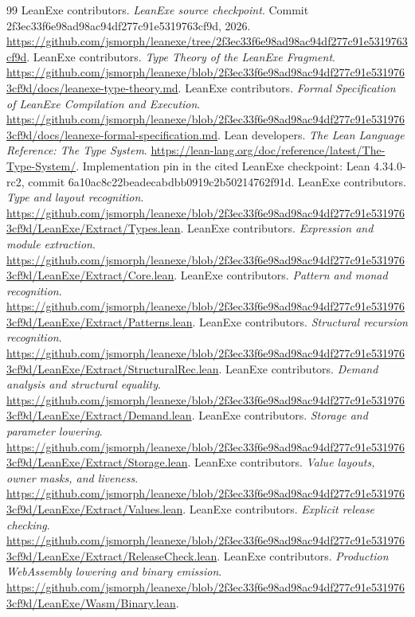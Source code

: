 \documentclass[11pt]{article}
\begin{document}
\begin{thebibliography}{99}
\small
{} LeanExe contributors. \emph{LeanExe source checkpoint}. Commit 2f3ec33f6e98ad98ac94df277c91e5319763cf9d, 2026. \url{https://github.com/jsmorph/leanexe/tree/2f3ec33f6e98ad98ac94df277c91e5319763cf9d}.
 LeanExe contributors. \emph{Type Theory of the LeanExe Fragment}. \url{https://github.com/jsmorph/leanexe/blob/2f3ec33f6e98ad98ac94df277c91e5319763cf9d/docs/leanexe-type-theory.md}.
 LeanExe contributors. \emph{Formal Specification of LeanExe Compilation and Execution}. \url{https://github.com/jsmorph/leanexe/blob/2f3ec33f6e98ad98ac94df277c91e5319763cf9d/docs/leanexe-formal-specification.md}.
 Lean developers. \emph{The Lean Language Reference: The Type System}. \url{https://lean-lang.org/doc/reference/latest/The-Type-System/}. Implementation pin in the cited LeanExe checkpoint: Lean 4.34.0-rc2, commit 6a10ac8c22beadecabdbb0919c2b50214762f91d.
 LeanExe contributors. \emph{Type and layout recognition}. \url{https://github.com/jsmorph/leanexe/blob/2f3ec33f6e98ad98ac94df277c91e5319763cf9d/LeanExe/Extract/Types.lean}.
 LeanExe contributors. \emph{Expression and module extraction}. \url{https://github.com/jsmorph/leanexe/blob/2f3ec33f6e98ad98ac94df277c91e5319763cf9d/LeanExe/Extract/Core.lean}.
 LeanExe contributors. \emph{Pattern and monad recognition}. \url{https://github.com/jsmorph/leanexe/blob/2f3ec33f6e98ad98ac94df277c91e5319763cf9d/LeanExe/Extract/Patterns.lean}.
 LeanExe contributors. \emph{Structural recursion recognition}. \url{https://github.com/jsmorph/leanexe/blob/2f3ec33f6e98ad98ac94df277c91e5319763cf9d/LeanExe/Extract/StructuralRec.lean}.
 LeanExe contributors. \emph{Demand analysis and structural equality}. \url{https://github.com/jsmorph/leanexe/blob/2f3ec33f6e98ad98ac94df277c91e5319763cf9d/LeanExe/Extract/Demand.lean}.
 LeanExe contributors. \emph{Storage and parameter lowering}. \url{https://github.com/jsmorph/leanexe/blob/2f3ec33f6e98ad98ac94df277c91e5319763cf9d/LeanExe/Extract/Storage.lean}.
 LeanExe contributors. \emph{Value layouts, owner masks, and liveness}. \url{https://github.com/jsmorph/leanexe/blob/2f3ec33f6e98ad98ac94df277c91e5319763cf9d/LeanExe/Extract/Values.lean}.
 LeanExe contributors. \emph{Explicit release checking}. \url{https://github.com/jsmorph/leanexe/blob/2f3ec33f6e98ad98ac94df277c91e5319763cf9d/LeanExe/Extract/ReleaseCheck.lean}.
 LeanExe contributors. \emph{Production WebAssembly lowering and binary emission}. \url{https://github.com/jsmorph/leanexe/blob/2f3ec33f6e98ad98ac94df277c91e5319763cf9d/LeanExe/Wasm/Binary.lean}.

\end{thebibliography}
\end{document}
